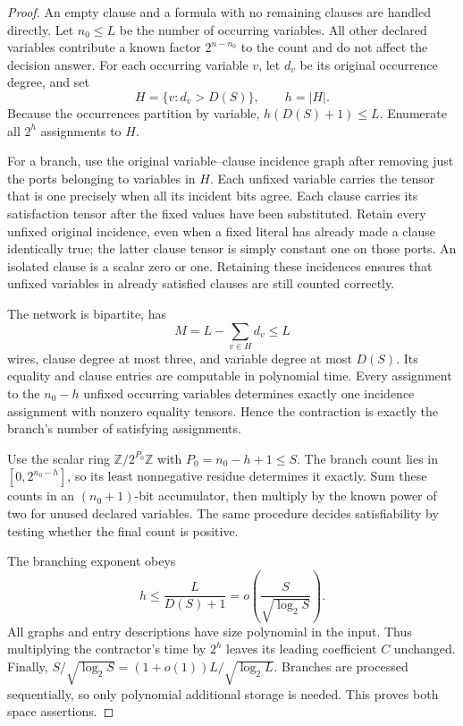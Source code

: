 \begin{proof}
An empty clause and a formula with no remaining clauses are handled
directly. Let $n_0\le L$ be the number of occurring variables. All other
declared variables contribute a known factor $2^{n-n_0}$ to the count
and do not affect the decision answer. For each occurring variable $v$,
let $d_v$ be its original occurrence degree, and set
\[
 H=\{v:d_v>D(S)\},\qquad h=|H|.
\]
Because the occurrences partition by variable,
$h(D(S)+1)\le L$. Enumerate all $2^h$ assignments to $H$.

For a branch, use the original variable--clause incidence graph after
removing just the ports belonging to variables in $H$. Each unfixed
variable carries the tensor that is one precisely when all its incident
bits agree. Each clause carries its satisfaction tensor after the fixed
values have been substituted. Retain every unfixed original incidence,
even when a fixed literal has already made a clause identically true;
the latter clause tensor is simply constant one on those ports. An
isolated clause is a scalar zero or one. Retaining these incidences
ensures that unfixed variables in already satisfied clauses are still
counted correctly.

The network is bipartite, has
\[
 M=L-\sum_{v\in H}d_v\le L
\]
wires, clause degree at most three, and variable degree at most $D(S)$.
Its equality and clause entries are computable in polynomial time.
Every assignment to the $n_0-h$ unfixed occurring variables determines
exactly one incidence assignment with nonzero equality tensors.
Hence the contraction is exactly the branch's number of satisfying
assignments.

Use the scalar ring $\mathbb Z/2^{P_0}\mathbb Z$ with
$P_0=n_0-h+1\le S$. The branch count lies in $[0,2^{n_0-h}]$,
so its least nonnegative residue determines it exactly. Sum these
counts in an $(n_0+1)$-bit accumulator, then multiply by the known
power of two for unused declared variables. The same procedure
decides satisfiability by testing whether the final count is positive.

The branching exponent obeys
\[
 h\le \frac{L}{D(S)+1}
 =o\!\left(\frac{S}{\sqrt{\log_2 S}}\right).
\]
All graphs and entry descriptions have size polynomial in the input.
Thus multiplying the contractor's time by $2^h$ leaves its leading
coefficient $C$ unchanged. Finally,
$S/\sqrt{\log_2 S}=(1+o(1))L/\sqrt{\log_2 L}$.
Branches are processed sequentially, so only polynomial additional
storage is needed. This proves both space assertions.
\end{proof}

